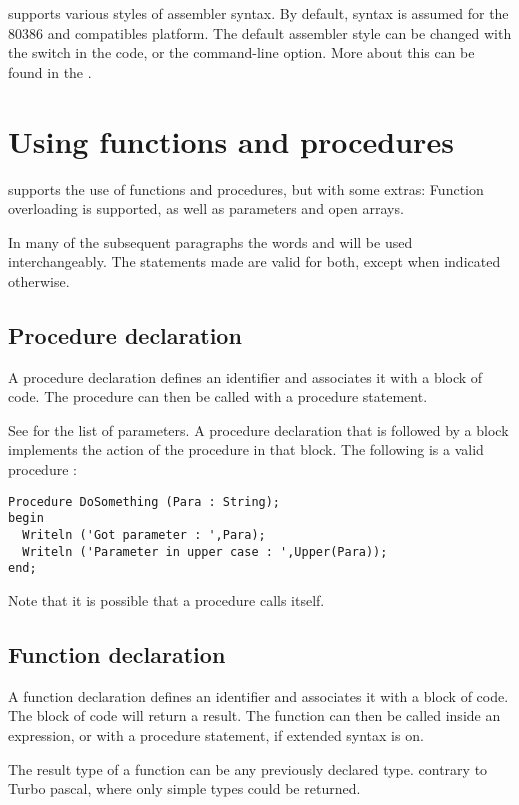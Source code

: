 \fpc supports various styles of assembler syntax. By default, 
syntax is assumed for the 80386 and compatibles platform.
The default assembler style can be changed with the 
switch in the code, or the  command-line option. More about this can
be found in the \progref.


\chapter{Using functions and procedures}
\label{ch:Procedures}
\fpc supports the use of functions and procedures, but with some extras:
Function overloading is supported, as well as  parameters and
open arrays.

\begin{remark} In many of the subsequent paragraphs the words 
and  will be used interchangeably. The statements made are
valid for both, except when indicated otherwise.
\end{remark}

\section{Procedure declaration}
A procedure declaration defines an identifier and associates it with a
block of code. The procedure can then be called with a procedure statement.

See  for the list of parameters.
A procedure declaration that is followed by a block implements the action of
the procedure in that block.
The following is a valid procedure :
\begin{verbatim}
Procedure DoSomething (Para : String);
begin
  Writeln ('Got parameter : ',Para);
  Writeln ('Parameter in upper case : ',Upper(Para));
end;
\end{verbatim}
Note that it is possible that a procedure calls itself.

\section{Function declaration}
A function declaration defines an identifier and associates it with a
block of code. The block of code will return a result.
The function can then be called inside an expression, or with a procedure
statement, if extended syntax is on.

The result type of a function can be any previously declared type.
contrary to Turbo pascal, where only simple types could be returned.

